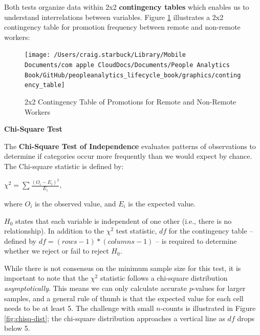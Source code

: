 \documentclass[]{book}
\begin{document}
Both tests organize data within 2x2 \textbf{contingency tables} which enables us to understand interrelations between variables. Figure \ref{fig:contingency-tbl} illustrates a 2x2 contingency table for promotion frequency between remote and non-remote workers:

\begin{figure}

{\centering \texttt{[image: /Users/craig.starbuck/Library/Mobile Documents/com~apple~CloudDocs/Documents/People Analytics Book/GitHub/peopleanalytics\_lifecycle\_book/graphics/contingency\_table]} 

}

\caption{2x2 Contingency Table of Promotions for Remote and Non-Remote Workers}\label{fig:contingency-tbl}
\end{figure}

\textbf{Chi-Square Test}

The \textbf{Chi-Square Test of Independence} evaluates patterns of observations to determine if categories occur more frequently than we would expect by chance. The Chi-square statistic is defined by:

\({\chi}^2 = \sum\frac{(O_i - E_i)^2}{E_i},\)

where \(O_i\) is the observed value, and \(E_i\) is the expected value.

\(H_0\) states that each variable is independent of one other (i.e., there is no relationship). In addition to the \({\chi}^2\) test statistic, \(df\) for the contingency table -- defined by \(df = (rows - 1) * (columns - 1)\) -- is required to determine whether we reject or fail to reject \(H_0\).

While there is not consensus on the minimum sample size for this test, it is important to note that the \({\chi}^2\) statistic follows a chi-square distribution \emph{asymptotically}. This means we can only calculate accurate \(p\)-values for larger samples, and a general rule of thumb is that the expected value for each cell needs to be at least 5. The challenge with small \(n\)-counts is illustrated in Figure \ref{fig:chisq-dist}; the chi-square distribution approaches a vertical line as \(df\) drops below 5.
\end{document}

